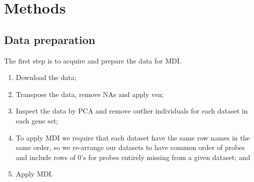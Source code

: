 \documentclass[11pt]{article} %
\begin{document}
	\section{Methods}
	\subsection{Data preparation}
	The first step is to acquire and prepare the data for MDI.
	\begin{enumerate}
		\item Download the data;
		\item Transpose the data, remove NAs and apply vsn;
		\item Inspect the data by PCA and remove outlier individuals for each dataset in each gene set;
		\item To apply MDI we require that each dataset have the same row names in the same order, so we re-arrange our datasets to have common order of probes and include rows of 0’s for probes entirely missing from a given dataset; and
		\item Apply MDI.
	\end{enumerate}
	

	
	
	
\end{document}
